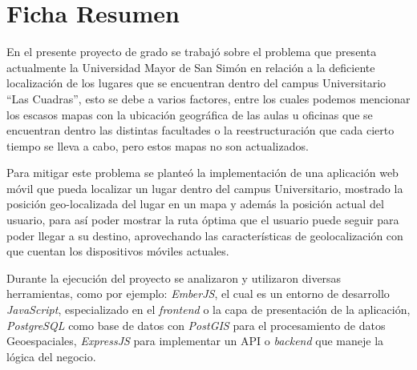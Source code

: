 \chapter*{Ficha Resumen} %





En el presente proyecto de grado se trabajó sobre el problema que presenta actualmente la Universidad Mayor de San Simón en relación a la deficiente localización de los lugares que se encuentran dentro del campus Universitario ``Las Cuadras'', esto se debe a varios factores, entre los cuales podemos mencionar los escasos mapas con la ubicación geográfica de las aulas u oficinas que se encuentran dentro las distintas facultades o la reestructuración que cada cierto tiempo se lleva a cabo, pero estos mapas no son actualizados.

Para mitigar este problema se planteó la implementación de una aplicación web móvil que pueda localizar un lugar dentro del campus Universitario, mostrado la posición geo-localizada del lugar en un mapa y además la posición actual del usuario, para así poder mostrar la ruta óptima que el usuario puede seguir para poder llegar a su destino, aprovechando las características de  geolocalización con que cuentan los dispositivos móviles actuales.

Durante la ejecución del proyecto se analizaron y utilizaron diversas herramientas, como por ejemplo: \emph{EmberJS}, el cual es un entorno de desarrollo \emph{JavaScript}, especializado en el \emph{frontend} o la capa de presentación de la aplicación, \emph{PostgreSQL} como base de datos con \emph{PostGIS} para el procesamiento de datos Geoespaciales, \emph{ExpressJS} para implementar un API o \emph{backend} que maneje la lógica del negocio.


